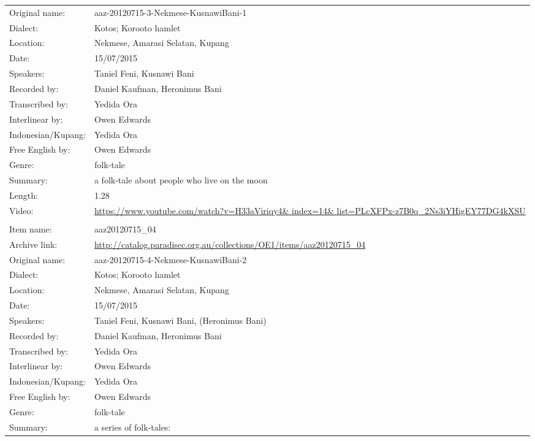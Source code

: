 \begin{longtable}{lL{.67\textwidth}}
Original name:			& aaz-20120715-3-Nekmese-KusnawiBani-1\\
Dialect:				& Kotos; Koro{\Q}oto hamlet \\
Location:				& Nekmese{\Q}, Amarasi Selatan, Kupang \\
Date:				& 15/07/2015 \\
Speakers:				& Taniel Feni, Kusnawi Bani\\
Recorded by:			& Daniel Kaufman, Heronimus Bani\\
Transcribed by:		& Yedida Ora\\
Interlinear by:		& Owen Edwards \\
Indonesian/Kupang:		& Yedida Ora\\
Free English by:		& Owen Edwards\\
Genre:				& folk-tale\\
Summary:				& a folk-tale about people who live on the moon\\
Length:				& 1.28\\
Video: & \url{https://www.youtube.com/watch?v=H33aViriqy4& index=14& list=PLcXFPx-z7B0q_2Ns3iYHigEY77DG4kXSU}\\ \lspbottomrule
{}			& \\
Item name:			& aaz20120715{\_}04\\
Archive link:			& \url{http://catalog.paradisec.org.au/collections/OE1/items/aaz20120715_04}\\
Original name:			& aaz-20120715-4-Nekmese-KusnawiBani-2\\
Dialect:				& Kotos; Koro{\Q}oto hamlet \\
Location:				& Nekmese{\Q}, Amarasi Selatan, Kupang \\
Date:				& 15/07/2015 \\
Speakers:				& Taniel Feni, Kusnawi Bani, (Heronimus Bani)\\
Recorded by:			& Daniel Kaufman, Heronimus Bani\\
Transcribed by:		& Yedida Ora\\
Interlinear by:		& Owen Edwards \\
Indonesian/Kupang:		& Yedida Ora\\
Free English by:		& Owen Edwards\\
Genre:				& folk-tale\\
Summary:				& a series of folk-tales: \\

\end{longtable}
